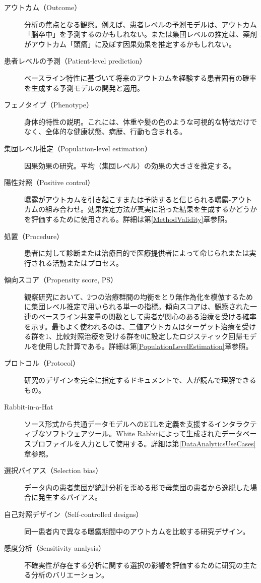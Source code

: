 \documentclass[
  11pt]{book}
\theoremstyle{definition}
\theoremstyle{definition}
\theoremstyle{definition}
\theoremstyle{definition}
\theoremstyle{remark}
\begin{document}
\begin{description}
\item[アウトカム（Outcome）]
分析の焦点となる観察。例えば、患者レベルの予測モデルは、アウトカム「脳卒中」を予測するのかもしれない。または集団レベルの推定は、薬剤がアウトカム「頭痛」に及ぼす因果効果を推定するかもしれない。
\item[患者レベルの予測（Patient-level prediction）]
ベースライン特性に基づいて将来のアウトカムを経験する患者固有の確率を生成する予測モデルの開発と適用。
\item[フェノタイプ（Phenotype）]
身体的特性の説明。これには、体重や髪の色のような可視的な特徴だけでなく、全体的な健康状態、病歴、行動も含まれる。
\item[集団レベル推定（Population-level estimation）]
因果効果の研究。平均（集団レベル）の効果の大きさを推定する。
\item[陽性対照（Positive control）]
曝露がアウトカムを引き起こすまたは予防すると信じられる曝露-アウトカムの組み合わせ。効果推定方法が真実に沿った結果を生成するかどうかを評価するために使用される。詳細は第\ref{MethodValidity}章参照。
\item[処置（Procedure）]
患者に対して診断または治療目的で医療提供者によって命じられまたは実行される活動またはプロセス。
\item[傾向スコア（Propensity score, PS）]
観察研究において、2つの治療群間の均衡をとり無作為化を模倣するために集団レベル推定で用いられる単一の指標。傾向スコアは、観察された一連のベースライン共変量の関数として患者が関心のある治療を受ける確率を示す。最もよく使われるのは、二値アウトカムはターゲット治療を受ける群を1、比較対照治療を受ける群を0に設定したロジスティック回帰モデルを使用した計算である。詳細は第\ref{PopulationLevelEstimation}章参照。
\item[プロトコル（Protocol）]
研究のデザインを完全に指定するドキュメントで、人が読んで理解できるもの。
\item[Rabbit-in-a-Hat]
ソース形式から共通データモデルへのETLを定義を支援するインタラクティブなソフトウェアツール。White Rabbitによって生成されたデータベースプロファイルを入力として使用する。詳細は第\ref{DataAnalyticsUseCases}章参照。
\item[選択バイアス（Selection bias）]
データ内の患者集団が統計分析を歪める形で母集団の患者から逸脱した場合に発生するバイアス。
\item[自己対照デザイン（Self-controlled designs）]
同一患者内で異なる曝露期間中のアウトカムを比較する研究デザイン。
\item[感度分析（Sensitivity analysis）]
不確実性が存在する分析に関する選択の影響を評価するために研究の主たる分析のバリエーション。

\end{description}
\end{document}
